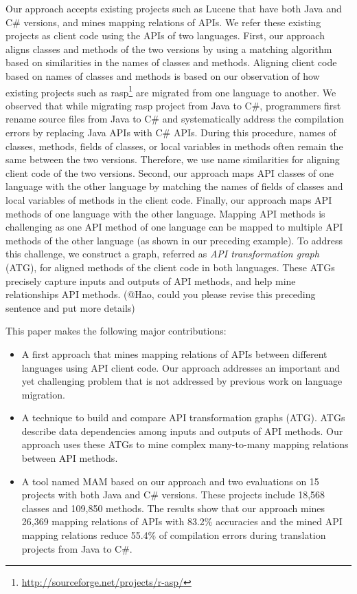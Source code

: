 Our approach accepts existing projects such as Lucene that have both Java and C\# versions,
and mines mapping relations of APIs. We refer these existing projects as client code
using the APIs of two languages. First, our approach aligns classes and methods of the 
two versions by using a matching algorithm based on similarities in the names
of classes and methods. Aligning client code based on names of classes and methods is
based on our observation of how existing projects such as rasp\footnote{\url{http://sourceforge.net/projects/r-asp/}} are
migrated from one language to another. We observed that while migrating rasp project
from Java to C\#, programmers first rename source files from Java to C\# and systematically
address the compilation errors by replacing Java APIs with C\# APIs. During this procedure,
names of classes, methods, fields of classes, or local variables in methods often remain
the same between the two versions. Therefore, we use name similarities for aligning client
code of the two versions. Second, our approach maps API classes of one language with
the other language by matching the names of fields of classes and local variables of methods in the client code.
Finally, our approach maps API methods of one language with the other language. Mapping API methods
is challenging as one API method of one language can be mapped to multiple API
methods of the other language (as shown in our preceding example). To address this challenge, 
we construct a graph, referred as \emph{API transformation graph} (ATG), for aligned methods
of the client code in both languages. These ATGs precisely capture inputs and outputs
of API methods, and help mine relationships API methods. (@Hao, could you please revise this preceding sentence and put more details)

This paper makes the following major contributions:

\begin{itemize}\vspace*{-1.5ex}
\item A first approach that mines mapping relations of APIs between
different languages using API client code. Our
approach addresses an important and yet challenging problem that is not
addressed by previous work on language migration.\vspace*{-1.5ex}
\item A technique to build and compare API
transformation graphs (ATG). ATGs describe data dependencies among
inputs and outputs of API methods. Our approach uses these ATGs to
mine complex many-to-many mapping relations between API methods.\vspace*{-1.5ex}
\item A tool named MAM based on our approach and two
evaluations on 15 projects with both Java and C\# versions.
These projects include 18,568 classes and 109,850 methods. The
results show that our approach mines 26,369 mapping relations of
APIs with 83.2\% accuracies and the mined API mapping relations reduce 55.4\% of
compilation errors during translation projects from Java to C\#.
\end{itemize}\vspace*{-1.5ex}


